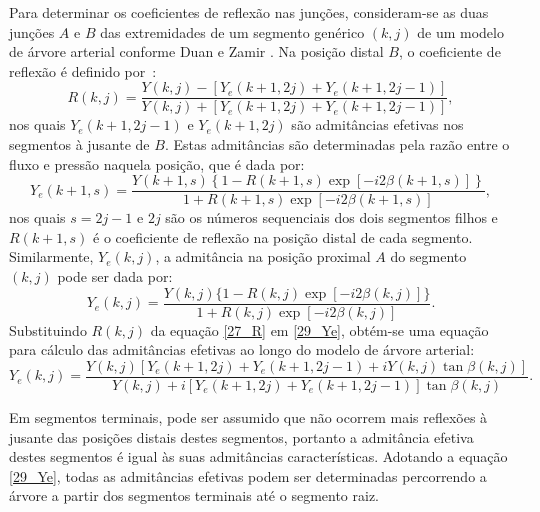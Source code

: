 \documentclass[
        english,			
        brazil			        %
        ,<...>]{abntbibufjf}
\begin{document}
Para determinar os coeficientes de reflexão nas junções, consideram-se as duas junções $A$ e $B$ das extremidades de um segmento genérico $(k,j)$ de um modelo de árvore arterial conforme Duan e Zamir \cite{Duan}. Na posição distal $B$, o coeficiente de reflexão é definido por~\cite{Fung,Lighthill}:
\begin{equation}
R(k,j) = \frac{Y(k,j) - [Y_e(k+1,2j) + Y_e(k+1,2j-1)]}{Y(k,j) + [Y_e(k+1,2j) + Y_e(k+1,2j-1)]},
\label{27_R}
\end{equation}
nos quais $Y_e(k+1,2j-1)$ e $Y_e(k+1,2j)$ são admitâncias efetivas nos segmentos à jusante de $B$. Estas admitâncias são determinadas pela razão entre o fluxo e pressão naquela posição, que é dada por:
\begin{equation}
Y_e(k+1,s) = \frac{Y(k+1,s)\left\{1 - R(k+1,s)\exp{[-i2\beta(k+1,s)]}\right\}}{1 + R(k+1,s)\exp{[-i2\beta(k+1,s)]}},
\label{28_Ye}
\end{equation}
nos quais $s = 2j-1$ e $2j$ são os números sequenciais dos dois segmentos filhos e $R(k+1,s)$ é o coeficiente de reflexão na posição distal de cada segmento. Similarmente, $Y_e(k,j)$, a admitância na posição proximal $A$ do segmento $(k,j)$ pode ser dada por:
\begin{equation}
Y_e(k,j) = \frac{Y(k,j)\{1 - R(k,j)\exp{[-i2\beta(k,j)]}\} }{1 + R(k,j)\exp{[-i2\beta(k,j)]}}
\label{29_Ye}.
\end{equation}
Substituindo $R(k,j)$ da equação \eqref{27_R} em \eqref{29_Ye}, obtém-se  uma equação para cálculo das admitâncias efetivas ao longo do modelo de árvore arterial:
\begin{equation}
Y_e(k,j) = \frac{Y(k,j) [Y_e(k+1,2j) + Y_e(k+1,2j-1)+ i Y(k,j)\tan{\beta(k,j)}]}{Y(k,j) + i[Y_e(k+1,2j) + Y_e(k+1,2j-1)]\tan{\beta(k,j)}}.
\label{30_Ye}
\end{equation}

Em segmentos terminais, pode ser assumido que não ocorrem mais reflexões à jusante das posições distais destes segmentos, portanto a admitância efetiva destes segmentos é igual às suas admitâncias características. Adotando a equação \eqref{29_Ye}, todas as admitâncias efetivas podem ser determinadas percorrendo a árvore a partir dos segmentos terminais até o segmento raiz.

\end{document}
